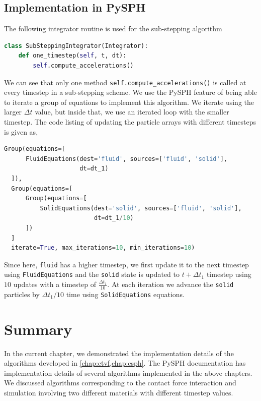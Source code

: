 \subsection{Implementation in PySPH}
\label{sec:pysph-substepping-algorithm}
The following integrator routine is used for the sub-stepping algorithm
\lstset{basicstyle=\footnotesize\ttfamily}
\begin{lstlisting}[label={contact:equations},frame=lines,language=Python,upquote=True]
class SubSteppingIntegrator(Integrator):
    def one_timestep(self, t, dt):
        self.compute_accelerations()
\end{lstlisting}
We can see that only one method \texttt{self.compute\_accelerations()} is
called at every timestep in a sub-stepping scheme. We use the PySPH feature of
being able to iterate a group of equations to implement this algorithm. We
iterate using the larger $\Delta t$ value, but inside that, we use an iterated
loop with the smaller timestep. The code listing of updating the particle
arrays with different timesteps is given as,
\lstset{basicstyle=\footnotesize\ttfamily}
\begin{lstlisting}[label={contact:equations},frame=lines,language=Python,upquote=True]
  Group(equations=[
      FluidEquations(dest='fluid', sources=['fluid', 'solid'],
                     dt=dt_1)
  ]),
  Group(equations=[
      Group(equations=[
          SolidEquations(dest='solid', sources=['fluid', 'solid'],
                         dt=dt_1/10)
      ])
  ]
  iterate=True, max_iterations=10, min_iterations=10)
\end{lstlisting}
Since here, \texttt{fluid} has a higher timestep, we first update it to the next
timestep using \texttt{FluidEquations} and the \texttt{solid} state is updated
to $t + \Delta t_1$ timestep using $10$ updates with a timestep of
$\frac{\Delta t_1}{10}$. At each iteration we advance the \texttt{solid} particles by
$\Delta t_1 / 10$ time using \texttt{SolidEquations} equations.


\section{Summary}
\label{sec:id:summary}
In the current chapter, we demonstrated the implementation details of the
algorithms developed in \cref{chap:ctvf,chap:csph}. The PySPH documentation has
implementation details of several algorithms implemented in the above chapters.
We discussed algorithms corresponding to the contact force interaction and
simulation involving two different materials with different timestep values.

